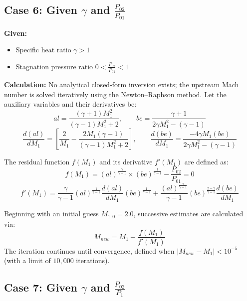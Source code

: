 \subsection*{Case 6: Given $\gamma$ and $\frac{P_{02}}{P_{01}}$}

\textbf{Given:}
\begin{itemize}[nosep]
    \item Specific heat ratio $\gamma > 1$
    \item Stagnation pressure ratio $0 < \frac{P_{02}}{P_{01}} < 1$
\end{itemize}

\textbf{Calculation:} No analytical closed-form inversion exists; the upstream Mach number is solved iteratively using the Newton--Raphson method. Let the auxiliary variables and their derivatives be:
\begin{equation}
al = \frac{(\gamma+1)M_1^2}{(\gamma-1)M_1^2+2}, \qquad be = \frac{\gamma+1}{2\gamma M_1^2-(\gamma-1)}
\end{equation}
\begin{equation}
\frac{d(al)}{dM_1} = \left[\frac{2}{M_1} - \frac{2M_1(\gamma-1)}{(\gamma-1)M_1^2+2}\right], \qquad \frac{d(be)}{dM_1} = \frac{-4\gamma M_1(be)}{2\gamma M_1^2-(\gamma-1)}
\end{equation}

The residual function $f(M_1)$ and its derivative $f'(M_1)$ are defined as:
\begin{equation}
f(M_1) = (al)^{\frac{\gamma}{\gamma-1}}\times(be)^{\frac{1}{\gamma-1}} - \frac{P_{02}}{P_{01}} = 0
\end{equation}
\begin{equation}
f'(M_1) = \frac{\gamma}{\gamma-1}(al)^{\frac{1}{\gamma-1}}\frac{d(al)}{dM_1}(be)^{\frac{1}{\gamma-1}} + \frac{(al)^{\frac{\gamma}{\gamma-1}}}{\gamma-1}(be)^{\frac{2-\gamma}{\gamma-1}}\frac{d(be)}{dM_1}
\end{equation}

Beginning with an initial guess $M_{1,0} = 2.0$, successive estimates are calculated via:
\begin{equation}
M_{new} = M_1 - \frac{f(M_1)}{f'(M_1)}
\end{equation}
The iteration continues until convergence, defined when $|M_{new} - M_1| < 10^{-5}$ (with a limit of $10{,}000$ iterations).


\subsection*{Case 7: Given $\gamma$ and $\frac{P_{02}}{P_1}$}

